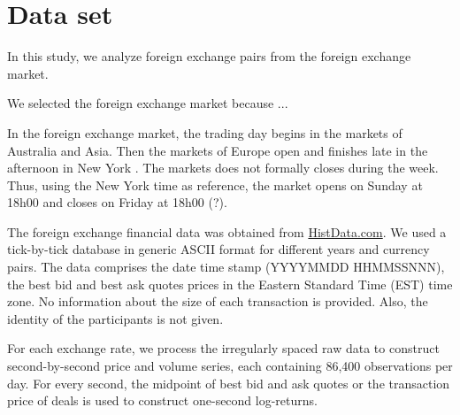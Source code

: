 \section{Data set}\label{sec:data_set}

In this study, we analyze foreign exchange pairs from the foreign exchange market.

We selected the foreign exchange market because ...

In the foreign exchange market, the trading day begins in the markets of
Australia and Asia. Then the markets of Europe open and finishes late in the
afternoon in New York \cite{forex_structure}. The markets does not formally
closes during the week. Thus, using the New York time as reference, the market
opens on Sunday at 18h00 and closes on Friday at 18h00 (?).

The foreign exchange financial data was obtained from
\href{www.histdata.com}{HistData.com}. We used a tick-by-tick database in generic ASCII
format for different years and currency pairs. The data comprises the date time
stamp (YYYYMMDD HHMMSSNNN),
the best bid and best ask quotes prices in the Eastern Standard Time (EST) time zone.
No information about the size of each transaction is provided. Also, the
identity of the participants is not given.

For each exchange rate, we process the irregularly
spaced raw data to construct second-by-second price and volume series, each
containing 86,400 observations per day. For every second, the midpoint of best
bid and ask quotes or the transaction price of deals is used to construct
one-second log-returns.

